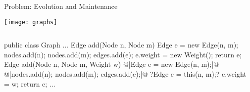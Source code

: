 \begin{frame}[fragile]{Problem: Evolution and Maintenance}
	\vspace{-1.7cm}
	\begin{flushright}		
		\texttt{[image: graphs]}
	\end{flushright}
	\vspace{0.1cm}
	\begin{tiny}
		\begin{columns}
				\vspace{-12mm}
\vspace{3mm}					
\begin{codetight}{}
public class Graph {
	...
	Edge add(Node n, Node m) {
		Edge e = new Edge(n, m);
		nodes.add(n); nodes.add(m); edges.add(e);
		e.weight = new Weight();
		return e;
	}
	Edge add(Node n, Node m, Weight w) {
		@|Edge e = new Edge(n, m);|@
		@|nodes.add(n); nodes.add(m); edges.add(e);|@
		?Edge e = this(n, m);?	
		e.weight = w;
		return e;
	}
	...
}
\end{codetight}	
				\vspace{2mm}
		\end{columns}
	\end{tiny}
\end{frame}

